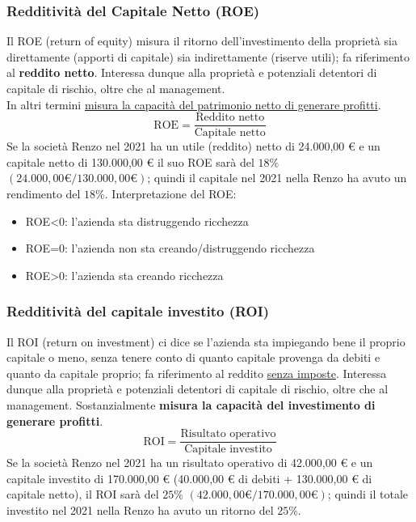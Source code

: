 \documentclass{article}
\begin{document}
\subsubsection{Redditività del Capitale Netto (ROE)}
Il ROE (return of equity) misura il ritorno dell'investimento della proprietà sia direttamente (apporti di capitale) sia indirettamente (riserve utili); fa riferimento al \textbf{reddito netto}. Interessa dunque alla proprietà e potenziali detentori di capitale di rischio, oltre che al management.\\
In altri termini \underline{misura la capacità del patrimonio netto di generare profitti}. 
\[
    \text{ROE} = \frac{\text{Reddito netto}}{\text{Capitale netto}}
\]
Se la società Renzo nel 2021 ha un utile (reddito) netto di
24.000,00 € e un capitale netto di 130.000,00 € il suo ROE sarà del $18\%$ $\left( 24.000,00 \text{€} / 130.000,00 \text{€} \right)$; quindi il capitale  nel 2021 nella Renzo ha avuto un rendimento del $18\%$.
Interpretazione del ROE:
\begin{itemize}
    \item ROE<0: l'azienda sta distruggendo ricchezza
    \item ROE=0: l'azienda non sta creando/distruggendo ricchezza
    \item ROE>0: l'azienda sta creando ricchezza
\end{itemize}



\subsubsection{Redditività del capitale investito (ROI)}
Il ROI (return on investment) ci dice se l'azienda sta impiegando bene il proprio capitale o meno, senza tenere conto di quanto capitale provenga da debiti e quanto da capitale proprio; fa riferimento al reddito \underline{senza imposte}. Interessa dunque alla proprietà e potenziali detentori di capitale di rischio, oltre che al management. Sostanzialmente \textbf{misura la capacità del investimento di generare profitti}.
\[
    \text{ROI} = \frac{\text{Risultato operativo}}{\text{Capitale investito}}
\]
Se la società Renzo nel 2021 ha un risultato operativo di 42.000,00
€ e un capitale investito di 170.000,00 € (40.000,00 € di debiti +
130.000,00 € di capitale netto), il ROI sarà del $25\%$ $\left( 42.000,00 \text{€} / 170.000,00 \text{€} \right)$; quindi il totale investito nel 2021 nella Renzo ha avuto un ritorno del $25\%$.
\end{document}
